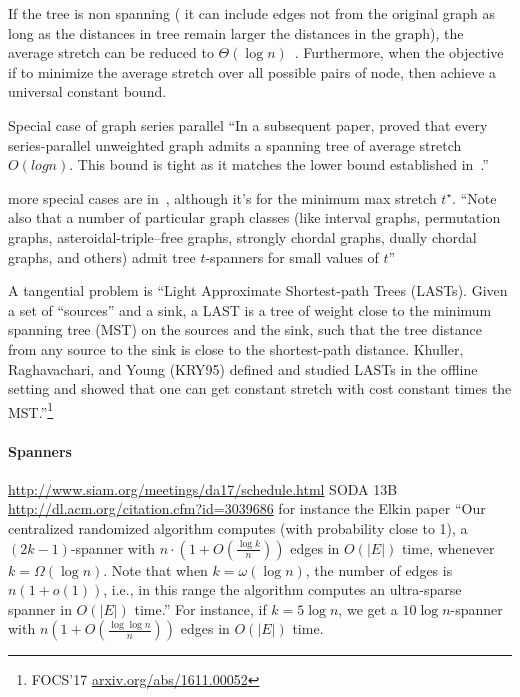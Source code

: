 If the tree is non spanning (\ie{} it can include edges not from the original graph as long as the
distances in tree remain larger the distances in the graph), the average stretch can be reduced to
$\Theta(\log n)$~\autocite{lognMetricBoundConf03}. Furthermore, when the objective if to minimize
the average stretch over all possible pairs of node, then \textcite{constantDistortion07} achieve a
universal constant bound.

Special case of graph
series parallel
\enquote{In a subsequent paper, \textcite{seriesParallel06} proved that every series-parallel
unweighted graph admits a spanning tree of average stretch $O(log n)$. This bound is tight as it
matches the lower bound established in~\autocite{cutsTrees99}.}

more special cases are in~\autocite{specialCase14}, although it's for the minimum max stretch
$t^\star$.
\enquote{Note also that a number of particular graph classes (like interval
graphs, permutation graphs, asteroidal-triple–free graphs, strongly chordal graphs,
dually chordal graphs, and others) admit tree $t$-spanners for small values of $t$}

A tangential problem is \enquote{Light Approximate Shortest-path Trees (LASTs).  Given a set of
“sources” and a sink, a LAST is a tree of weight close to the minimum spanning tree (MST) on the
sources and the sink, such that the tree distance from any source to the sink is close to the
shortest-path distance. Khuller, Raghavachari, and Young (KRY95) defined and studied LASTs in the
offline setting and showed that one can get constant stretch with cost constant times the
MST.}\footnote{FOCS'17 \href{https://arxiv.org/abs/1611.00052}{arxiv.org/abs/1611.00052}}

\paragraph{Spanners}
\label{par:spanners}

\url{http://www.siam.org/meetings/da17/schedule.html} SODA 13B \url{http://dl.acm.org/citation.cfm?id=3039686}
for instance the Elkin paper \enquote{Our centralized randomized algorithm computes (with
probability close to 1), a $(2k - 1)$-spanner with $n \cdot (1 + O(\frac{\log k}{n}))$ edges in
$O(|E|)$ time, whenever $k = \Omega(\log n)$. Note that when $k = \omega(\log n)$, the number of
edges is $n(1+o(1))$, i.e., in this range the algorithm computes an ultra-sparse spanner in $O(|E|)$
time.} For instance, if $k=5\log n$, we get a $10\log n$-spanner with $n\left(1+O\left(\frac{\log\log
n}{n}\right)\right)$ edges in $O(|E|)$ time.


